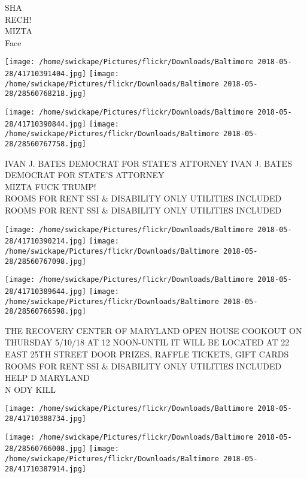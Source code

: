 \documentclass[10pt,letterpaper]{article}
\begin{document}
SHA\\
RECH!\\
MIZTA\\
Face\\
\pagebreak

\texttt{[image: /home/swickape/Pictures/flickr/Downloads/Baltimore 2018-05-28/41710391404.jpg]}
\texttt{[image: /home/swickape/Pictures/flickr/Downloads/Baltimore 2018-05-28/28560768218.jpg]}

\texttt{[image: /home/swickape/Pictures/flickr/Downloads/Baltimore 2018-05-28/41710390844.jpg]}
\texttt{[image: /home/swickape/Pictures/flickr/Downloads/Baltimore 2018-05-28/28560767758.jpg]}

IVAN J. BATES DEMOCRAT FOR STATE'S ATTORNEY IVAN J. BATES DEMOCRAT FOR STATE'S ATTORNEY\\
MIZTA FUCK TRUMP!\\
ROOMS FOR RENT SSI \& DISABILITY ONLY UTILITIES INCLUDED\\
ROOMS FOR RENT SSI \& DISABILITY ONLY UTILITIES INCLUDED\\
\pagebreak

\texttt{[image: /home/swickape/Pictures/flickr/Downloads/Baltimore 2018-05-28/41710390214.jpg]}
\texttt{[image: /home/swickape/Pictures/flickr/Downloads/Baltimore 2018-05-28/28560767098.jpg]}

\texttt{[image: /home/swickape/Pictures/flickr/Downloads/Baltimore 2018-05-28/41710389644.jpg]}
\texttt{[image: /home/swickape/Pictures/flickr/Downloads/Baltimore 2018-05-28/28560766598.jpg]}

THE RECOVERY CENTER OF MARYLAND OPEN HOUSE COOKOUT ON THURSDAY 5/10/18 AT 12 NOON{-}UNTIL IT WILL BE LOCATED AT 22 EAST 25TH STREET DOOR PRIZES, RAFFLE TICKETS, GIFT CARDS\\
ROOMS FOR RENT SSI \& DISABILITY ONLY UTILITIES INCLUDED\\
HELP D MARYLAND\\
N ODY KILL\\
\pagebreak

\texttt{[image: /home/swickape/Pictures/flickr/Downloads/Baltimore 2018-05-28/41710388734.jpg]}

\vspace{0.25in}
\texttt{[image: /home/swickape/Pictures/flickr/Downloads/Baltimore 2018-05-28/28560766008.jpg]}
\texttt{[image: /home/swickape/Pictures/flickr/Downloads/Baltimore 2018-05-28/41710387914.jpg]}
\end{document}
